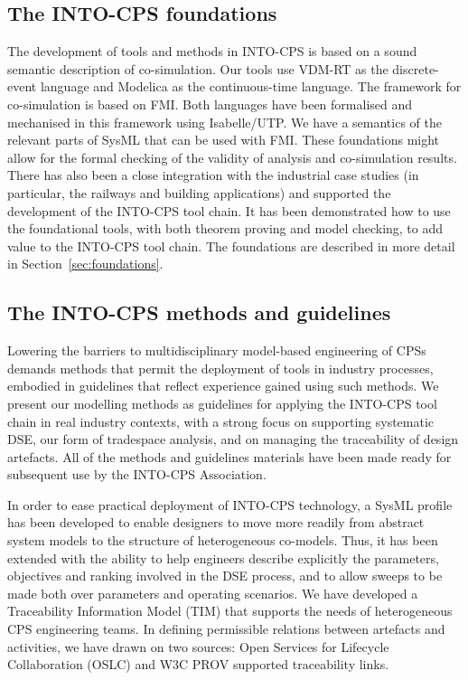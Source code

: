 \subsection{The INTO-CPS foundations}

The development of tools and methods in INTO-CPS is based on a sound semantic description of co-simulation. Our tools use VDM-RT as the discrete-event language and Modelica as the continuous-time language. The framework for co-simulation is based on FMI. Both languages have been formalised and mechanised in this framework using Isabelle/UTP. We have a semantics of the relevant parts of SysML that can be used with FMI. 
These foundations might allow for the formal checking of the validity of analysis and co-simulation results. 
There has also been a close integration with the industrial case studies (in particular, the railways and building applications) and supported the development of the INTO-CPS tool chain. It has been demonstrated how to use the foundational tools, with both theorem proving and model checking, to add value to the INTO-CPS tool chain. The foundations are described in more detail in Section~\ref{sec:foundations}.

\subsection{The INTO-CPS methods and guidelines}

Lowering the barriers to multidisciplinary model-based engineering of CPSs demands methods that permit the deployment of tools in industry processes, embodied in guidelines that reflect experience gained using such methods. We present our modelling methods as guidelines for applying the INTO-CPS tool chain in real industry contexts, with a strong focus on supporting systematic DSE, our form of tradespace analysis, and on managing the traceability of design artefacts. All of the methods and guidelines materials have been made ready for subsequent use by the INTO-CPS Association.

In order to ease practical deployment of INTO-CPS technology, a SysML profile has been developed to enable designers to move more readily from abstract system models to the structure of heterogeneous co-models. Thus, it has been extended with the ability to help engineers describe explicitly the parameters, objectives and ranking involved in the DSE process, and to allow sweeps to be made both over parameters and operating scenarios. We have developed a Traceability Information Model (TIM) that supports the needs of heterogeneous CPS engineering teams. In defining permissible relations between artefacts and activities, we have drawn on two sources: Open Services for Lifecycle Collaboration (OSLC)  and W3C PROV supported traceability links.

